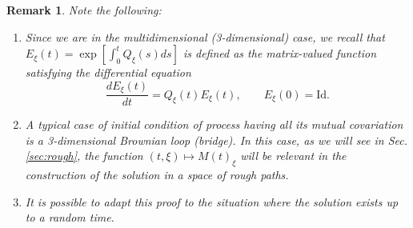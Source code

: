 \documentclass[a4paper,12pt,reqno]{amsart}
\newcommand{\R}{\mathbb{R}}
\newtheorem{remark}{Remark}
\begin{document}
\begin{remark} \label{RQVar} 
Note the following:
\begin{enumerate}
\item Since we are in the multidimensional  (3-dimensional) case, 
we recall that $E_{\xi}(t) = \exp \left[\int_0^t
Q_\xi(s) ds \right]$ is defined as the
matrix-valued function satisfying the differential equation
$$
\frac{d E_\xi(t)}{dt} = Q_\xi(t) E_\xi(t), \qquad
E_\xi(0) = \text{Id}.
$$
\item A typical case of initial condition of process having
all its mutual covariation is a 3-dimensional Brownian loop
(bridge). In this case, as we will see in Sec.\ref{sec:rough}, the
function $(t,\xi) \mapsto M(t)_\xi$ will be relevant in the
construction of the solution in a space of rough paths.
\item It is possible to adapt this proof to the situation where the
  solution exists up to a random time.
\end{enumerate}
\end{remark}
\end{document}
